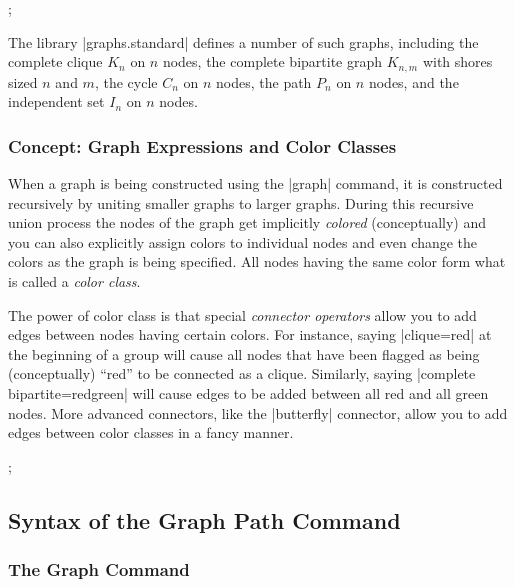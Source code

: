 \begin{codeexample}[preamble={\usetikzlibrary{graphs.standard}}]
\tikz {};
\end{codeexample}

The library |graphs.standard| defines a number of such graphs, including the
complete clique $K_n$ on $n$ nodes, the complete bipartite graph $K_{n,m}$ with
shores sized $n$ and $m$, the cycle $C_n$ on $n$ nodes, the path $P_n$ on $n$
nodes, and the independent set $I_n$ on $n$ nodes.


\subsubsection{Concept: Graph Expressions and Color Classes}

When a graph is being constructed using the |graph| command, it is constructed
recursively by uniting smaller graphs to larger graphs. During this recursive
union process the nodes of the graph get implicitly \emph{colored}
(conceptually) and you can also explicitly assign colors to individual nodes
and even change the colors as the graph is being specified. All nodes having
the same color form what is called a \emph{color class}.

The power of color class is that special \emph{connector operators} allow you
to add edges between nodes having certain colors. For instance, saying
|clique=red| at the beginning of a group will cause all nodes that have been
flagged as being (conceptually) ``red'' to be connected as a clique. Similarly,
saying |complete bipartite={red}{green}| will cause edges to be added between
all red and all green nodes. More advanced connectors, like the |butterfly|
connector, allow you to add edges between color classes in a fancy manner.
%
\begin{codeexample}[preamble={\usetikzlibrary{graphs}}]
\tikz [x=8mm, y=6mm, circle]
  ;
\end{codeexample}


\subsection{Syntax of the Graph Path Command}

\subsubsection{The Graph Command}

